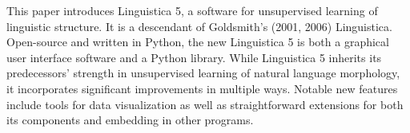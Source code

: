 This paper introduces Linguistica 5, a software for unsupervised learning of linguistic structure. It is a descendant of Goldsmith's (2001, 2006) Linguistica. Open-source and written in Python, the new Linguistica 5 is both a graphical user interface software and a Python library. While Linguistica 5 inherits its predecessors' strength in unsupervised learning of natural language morphology, it incorporates significant improvements in multiple ways. Notable new features include tools for data visualization as well as straightforward extensions for both its components and embedding in other programs.
